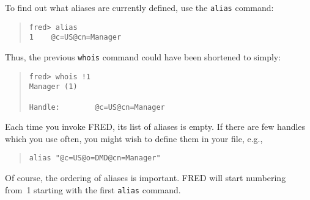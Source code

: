 To find out what aliases are currently defined,
use the \verb"alias" command:
\begin{quote}\smaller\begin{verbatim}
fred> alias
1    @c=US@cn=Manager
\end{verbatim}\end{quote}
Thus,
the previous \verb"whois" command could have been shortened to simply:
\begin{quote}\small\begin{verbatim}
fred> whois !1
Manager (1)

Handle:        @c=US@cn=Manager
\end{verbatim}\end{quote}
Each time you invoke FRED,
its list of aliases is empty.
If there are few handles which you use often,
you might wish to define them in your  file,
e.g.,
\begin{quote}\small\begin{verbatim}
alias "@c=US@o=DMD@cn=Manager"
\end{verbatim}\end{quote}
Of course,
the ordering of aliases is important.
FRED will start numbering from~1 starting with the first \verb"alias"
command.

